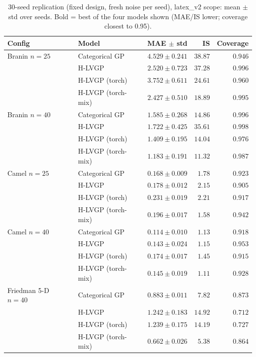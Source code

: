 \documentclass[11pt]{article}
\begin{document}
\begin{table}[htbp]
\centering
\small
\setlength{\tabcolsep}{4pt}
\caption{30-seed replication (fixed design, fresh noise per seed), latex\_v2 scope: mean $\pm$ std over seeds. Bold = best of the four models shown (MAE/IS lower; coverage closest to 0.95).}
\begin{tabular}{llrrr}
\toprule
Config & Model & MAE $\pm$ std & IS & Coverage \\
\midrule
Branin $n{=}25$ & Categorical GP & $4.529 \pm 0.241$ & $38.87$ & \textbf{$0.946$} \\
 & H-LVGP & $2.520 \pm 0.723$ & $37.28$ & $0.996$ \\
 & H-LVGP (torch) & $3.752 \pm 0.611$ & $24.61$ & $0.960$ \\
 & H-LVGP (torch-mix) & \textbf{$2.427 \pm 0.510$} & \textbf{$18.89$} & $0.995$ \\
\midrule
Branin $n{=}40$ & Categorical GP & $1.585 \pm 0.268$ & $14.86$ & $0.996$ \\
 & H-LVGP & $1.722 \pm 0.425$ & $35.61$ & $0.998$ \\
 & H-LVGP (torch) & $1.409 \pm 0.195$ & $14.04$ & \textbf{$0.976$} \\
 & H-LVGP (torch-mix) & \textbf{$1.183 \pm 0.191$} & \textbf{$11.32$} & $0.987$ \\
\midrule
Camel $n{=}25$ & Categorical GP & \textbf{$0.168 \pm 0.009$} & $1.78$ & $0.923$ \\
 & H-LVGP & $0.178 \pm 0.012$ & $2.15$ & $0.905$ \\
 & H-LVGP (torch) & $0.231 \pm 0.019$ & $2.21$ & $0.917$ \\
 & H-LVGP (torch-mix) & $0.196 \pm 0.017$ & \textbf{$1.58$} & \textbf{$0.942$} \\
\midrule
Camel $n{=}40$ & Categorical GP & \textbf{$0.114 \pm 0.010$} & $1.13$ & $0.918$ \\
 & H-LVGP & $0.143 \pm 0.024$ & $1.15$ & \textbf{$0.953$} \\
 & H-LVGP (torch) & $0.174 \pm 0.017$ & $1.45$ & $0.915$ \\
 & H-LVGP (torch-mix) & $0.145 \pm 0.019$ & \textbf{$1.11$} & $0.928$ \\
\midrule
Friedman 5-D $n{=}40$ & Categorical GP & $0.883 \pm 0.011$ & $7.82$ & \textbf{$0.873$} \\
 & H-LVGP & $1.242 \pm 0.183$ & $14.92$ & $0.712$ \\
 & H-LVGP (torch) & $1.239 \pm 0.175$ & $14.19$ & $0.727$ \\
 & H-LVGP (torch-mix) & \textbf{$0.662 \pm 0.026$} & \textbf{$5.38$} & $0.864$ \\

\end{tabular}
\end{table}
\end{document}
